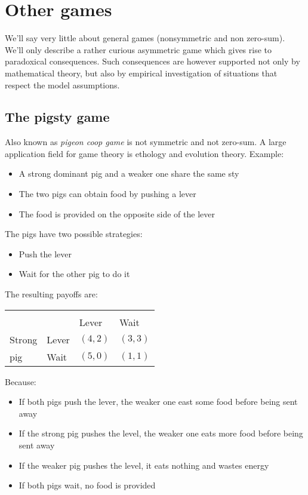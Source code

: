 \section{Other games}

We'll say very little about general games (nonsymmetric and non zero-sum). We'll only describe a rather curious asymmetric game which gives rise to paradoxical consequences. Such consequences are however supported not only by mathematical theory, but also by empirical investigation of situations that respect the model assumptions.

\subsection{The pigsty game}

Also known as \textit{pigeon coop game} is not symmetric and not zero-sum. A large application field for game theory is ethology and evolution theory. Example: 
\begin{itemize}
	\item A strong dominant pig and a weaker one share the same sty
	
	\item The two pigs can obtain food by pushing a lever
	
	\item The food is provided on the opposite side of the lever
\end{itemize}

The pigs have two possible strategies:
\begin{itemize}
	\item Push the lever
	
	\item Wait for the other pig to do it
\end{itemize}

The resulting payoffs are:
\begin{center}
	\renewcommand{\arraystretch}{1.2}
	\begin{tabular}{C{1.5cm} C{1.5cm} | C{1.5cm} C{1.5cm}}
		  \\
		& & Lever & Wait \\
		Strong & Lever & $(4,2)$ & $(3,3)$ \\
		pig & Wait & $(5,0)$ & $(1,1)$
	\end{tabular}
\end{center}

Because: 
\begin{itemize}
	\item If both pigs push the lever, the weaker one east some food before being sent away
	
	\item If the strong pig pushes the level, the weaker one eats more food before being sent away
	
	\item If the weaker pig pushes the level, it eats nothing and wastes energy
	
	\item If both pigs wait, no food is provided
\end{itemize}

